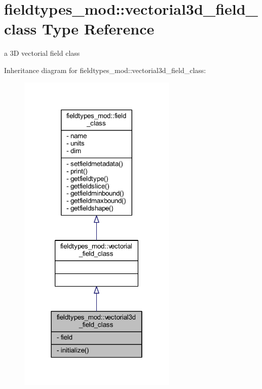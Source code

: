 \hypertarget{structfieldtypes__mod_1_1vectorial3d__field__class}{}\section{fieldtypes\+\_\+mod\+:\+:vectorial3d\+\_\+field\+\_\+class Type Reference}
\label{structfieldtypes__mod_1_1vectorial3d__field__class}


a 3D vectorial field class  




Inheritance diagram for fieldtypes\+\_\+mod\+:\+:vectorial3d\+\_\+field\+\_\+class\+:\nopagebreak
\begin{figure}[H]
\begin{center}
\leavevmode
\includegraphics[width=214pt]{structfieldtypes__mod_1_1vectorial3d__field__class__inherit__graph}
\end{center}
\end{figure}


